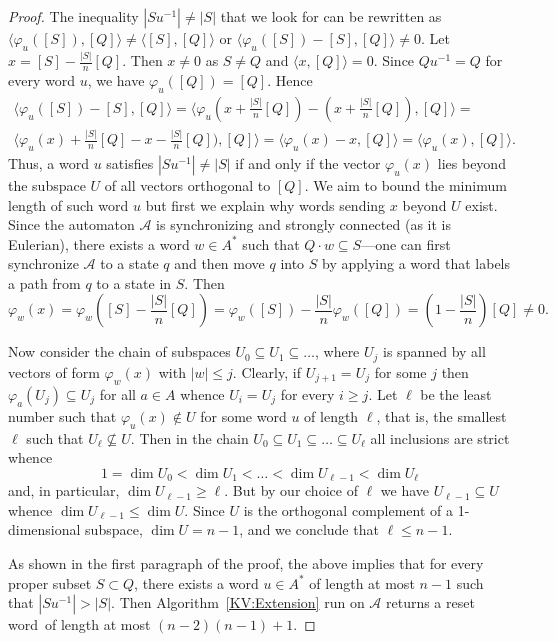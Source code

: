 \documentclass{irmaart}
\newcommand{\sw}{reset word}
\theoremstyle{plain}
\begin{document}
\begin{proof}
The inequality $|Su^{-1}|\ne|S|$ that we look for can be rewritten as
$\langle\varphi_u([S]),[Q]\rangle\ne\langle[S],[Q]\rangle$ or
$\langle\varphi_u([S])-[S],[Q]\rangle\ne0$. Let $x=[S]-\frac{|S|}n[Q]$. Then
$x\ne0$ as $S\ne Q$ and $\langle x,[Q]\rangle=0$. Since $Qu^{-1}=Q$ for every
word $u$, we have $\varphi_u([Q])=[Q]$. Hence
\begin{multline*}
\langle\varphi_u([S])-[S],[Q]\rangle=\langle\varphi_u(x+\frac{|S|}n[Q])-(x+\frac{|S|}n[Q]),[Q]\rangle=\\
\langle\varphi_u(x)+\frac{|S|}n[Q]-x-\frac{|S|}n[Q]),[Q]\rangle=\langle\varphi_u(x)-x,[Q]\rangle=
\langle\varphi_u(x),[Q]\rangle.
\end{multline*}
Thus, a word $u$ satisfies $|Su^{-1}|\ne|S|$ if and only if the vector
$\varphi_u(x)$ lies beyond the subspace $U$ of all vectors orthogonal to $[Q]$.
We aim to bound the minimum length of such word $u$ but
first we explain why words sending $x$ beyond $U$ exist. Since the automaton $\mathcal{A}$ is
synchronizing and strongly connected (as it is Eulerian), there exists a word
$w\in A^*$ such that $Q\cdot w\subseteq S$---one can first synchronize
$\mathcal{A}$ to a state $q$ and then move $q$ into $S$ by applying a word that
labels a path from $q$ to a state in $S$. Then
\begin{displaymath}
\varphi_w(x)=\varphi_w([S]-\frac{|S|}n[Q])=\varphi_w([S])-\frac{|S|}n\varphi_w([Q])=
(1-\frac{|S|}n)[Q]\ne0.
\end{displaymath}

Now consider the chain of subspaces $U_0\subseteq U_1\subseteq\dotsc$, where
$U_j$ is spanned by all vectors of form $\varphi_w(x)$ with $|w|\le j$.
Clearly, if $U_{j+1}=U_j$ for some $j$ then $\varphi_a(U_j)\subseteq U_j$ for
all $a\in A$ whence $U_i=U_j$ for every $i\ge j$. Let $\ell$ be the least
number such that $\varphi_u(x)\notin U$ for some word $u$ of length $\ell$,
that is, the smallest $\ell$ such that $U_\ell\nsubseteq U$. Then in the chain
$U_0\subseteq U_1\subseteq\dots\subseteq U_\ell$ all inclusions are strict
whence
\begin{displaymath}
1=\dim U_0 < \dim U_1 <\dots<\dim U_{\ell-1}<\dim U_\ell
\end{displaymath}
and, in particular, $\dim U_{\ell-1}\ge\ell$. But by our choice of $\ell$ we
have $U_{\ell-1}\subseteq U$ whence $\dim U_{\ell-1}\le \dim U$. Since $U$ is
the orthogonal complement of a 1-dimensional subspace, $\dim U=n-1$, and we
conclude that $\ell\le n-1$.

As shown in the first paragraph of the proof, the above implies that for every
proper subset $S\subset Q$, there exists a word $u\in A^*$ of length at most
$n-1$ such that $|Su^{-1}|>|S|$. Then Algorithm~\ref{KV:Extension} run on
$\mathcal{A}$ returns a \sw\ of length at most $(n-2)(n-1)+1$.
\end{proof}
\end{document}

